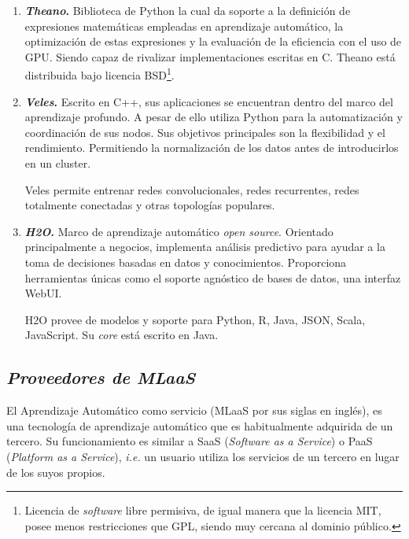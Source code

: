 \begin{enumerate}
\item \textbf{\textit{Theano}.}
Biblioteca de Python la cual da soporte a la definición  de expresiones matemáticas empleadas en aprendizaje automático, la optimización de estas expresiones y la evaluación de la eficiencia con el uso de GPU. Siendo capaz de rivalizar implementaciones escritas en C. Theano está distribuida bajo licencia BSD\footnote{Licencia de \textit{software} libre permisiva, de igual manera que la licencia MIT, posee menos restricciones que GPL, siendo muy cercana al dominio público.}.

\item \textbf{\textit{Veles}.}
Escrito en C++, sus aplicaciones se encuentran dentro del marco del aprendizaje profundo. A pesar de ello utiliza Python para la automatización y coordinación de sus nodos. Sus objetivos principales son la flexibilidad y el rendimiento. Permitiendo la normalización de los datos antes de introducirlos en un cluster.

Veles permite entrenar redes convolucionales, redes recurrentes, redes totalmente conectadas y otras topologías populares.

\item \textbf{\textit{H2O}.}
Marco de aprendizaje automático \textit{open source}. Orientado principalmente a negocios, implementa análisis predictivo para ayudar a la toma de decisiones basadas en datos y conocimientos. Proporciona herramientas únicas como el soporte agnóstico de bases de datos, una interfaz WebUI. 

H2O provee de modelos y soporte para Python, R, Java, JSON, Scala, JavaScript. Su \textit{core} está escrito en Java.

\end{enumerate}

\subsection{\textit{Proveedores de MLaaS}}\label{related:MLaaS}
El Aprendizaje Automático como servicio (MLaaS por sus siglas en inglés), es una tecnología de aprendizaje automático que es habitualmente adquirida de un tercero. Su funcionamiento es similar a SaaS (\textit{Software as a Service}) o PaaS (\textit{Platform as a Service}), \textit{i.e.} un usuario utiliza los servicios de un tercero en lugar de los suyos propios.

